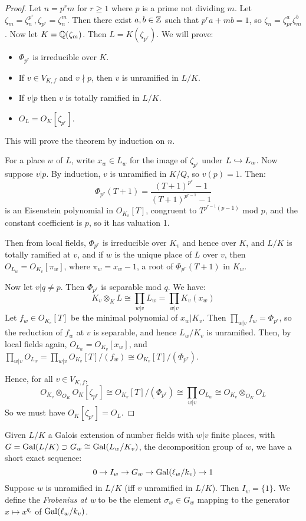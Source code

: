 \documentclass[10pt,a4paper]{article}
\begin{document}
\begin{proof}
  Let $n = p^r m$ for $r \geq 1$ where $p$ is a prime not dividing $m$. Let $\zeta_m = \zeta_n^{p^r}, \zeta_{p^r} = \zeta_n^m$. Then there exist $a,b \in \mathbb{Z}$ such that $p^r a + mb =1$, so $\zeta_n = \zeta_{pr}^a\zeta_m^b$. Now let $K = \mathbb{Q}(\zeta_m)$. Then $L = K(\zeta_{p^r})$. We will prove:
  \begin{itemize}
    \item $\Phi_{p^r}$ is irreducible over $K$.
    \item If $v \in V_{K, f}$ and $v \nmid p$, then $v$ is unramified in $L/K$.
    \item If $v |p$ then $v$ is totally ramified in $L/K$.
    \item $O_L = O_K[\zeta_{p^r}]$.
  \end{itemize}
  This will prove the theorem by induction on $n$.

  For a place $w$ of $L$, write $x_w \in L_w$ for the image of $\zeta_{p^r}$ under $L \hookrightarrow L_w$. Now suppose $v|p$. By induction, $v$ is unramified in $K/Q$, so $v(p) = 1$. Then:
  \[\Phi_{p^r}(T+1) = \frac{(T+1)^{p^r} -1 }{(T+1)^{p^{r-1}}-1}\]
  is an Eisenstein polynomial in $O_{K_v}[T]$, congruent to $T^{p^{r-1}(p-1)}$ mod $p$, and the constant coefficient is $p$, so it has valuation 1.

  Then from local fields, $\Phi_{p^r}$ is irreducible over $K_v$ and hence over $K$, and $L/K$ is totally ramified at $v$, and if $w$ is the unique place of $L$ over $v$, then $O_{L_w} = O_{K_v}[\pi_w]$, where $\pi_w = x_w-1$, a root of $\Phi_{p^r}(T+1)$ in $K_w$.

  Now let $v|q \neq p$. Then $\Phi_{p^r}$ is separable mod $q$. We have:
  \[K_v \otimes_K  L \cong \prod_{w|v}L_w = \prod_{w|v}K_v(x_w)\]
  Let $f_w \in O_{K_v}[T]$ be the minimal polynomial of $x_w|K_v$. Then $\prod_{w|v}f_w = \Phi_{p^r}$, so the reduction of $f_w$ at $v$ is separable, and hence $L_w/K_v$ is unramified. Then, by local fields again, $O_{L_w} = O_{K_v}[x_w]$, and $\prod_{w|v}O_{L_w} = \prod_{w|v}O_{K_v}[T]/(f_w) \cong O_{K_v}[T]/(\Phi_{p^r})$.

  Hence, for all $v \in V_{K,f}$,
  \[O_{K_v}\otimes_{O_K} O_K[\zeta_{p^r}] \cong O_{K_v}[T]/(\Phi_{p^r}) \cong \prod_{w|v} O_{L_w} \cong O_{K_v} \otimes_{O_K} O_L\]
  So we must have $O_K[\zeta_{p^r}] = O_L$.
\end{proof}
Given $L/K$ a Galois extension of number fields with $w|v$ finite places, with $G = \operatorname{Gal}(L/K) \supset G_w \cong \operatorname{Gal}(L_w/K_v)$, the decomposition group of $w$, we have a short exact sequence:
\[0 \to I_w \to G_w \to \operatorname{Gal}(\ell_w/k_v) \to 1\]
Suppose $w$ is unramified in $L/K$ (iff $v$ unramified in $L/K$). Then $I_w = \{1\}$. We define the \emph{Frobenius at w} to be the element $\sigma_w \in G_w$ mapping to the generator $x\mapsto x^{q_v}$ of $\operatorname{Gal}(\ell_w/k_v)$.
\end{document}
